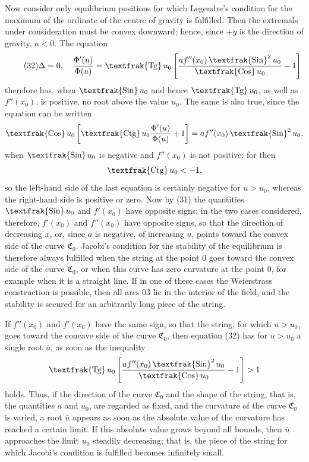 \documentclass[11pt,a4paper,leqno]{article}
\newcommand{\Cof}{\mathop{\text{\textfrak{Cos}}}\nolimits}
\newcommand{\Sin}{\mathop{\text{\textfrak{Sin}}}\nolimits}
\newcommand{\Tg}{\mathop{\text{\textfrak{Tg}}}\nolimits}
\newcommand{\Ctg}{\mathop{\text{\textfrak{Ctg}}}\nolimits}
\begin{document}
Now consider only equilibrium positions for which Legendre's condition for the maximum of the ordinate of the centre of gravity is fulfilled. Then the extremals under consideration must be convex downward; hence, since $+y$ is the direction of gravity, $a<0$. The equation
\begin{equation}\tag{32}
\Delta=0,
\quad
\frac{\Phi'(u)}{\Phi(u)}=\Tg u_0\left[\frac{a f''(x_0)\Sin^2u_0}{\Cof u_0}-1\right]
\end{equation}
therefore has, when $\Sin u_0$ and hence $\Tg u_0$, as well as $f''(x_0)$, is positive, no root above the value $u_0$. The same is also true, since the equation can be written
\[
\Cof u_0\left[\Ctg u_0\frac{\Phi'(u)}{\Phi(u)}+1\right]=a f''(x_0)\Sin^2u_0,
\]
when $\Sin u_0$ is negative and $f''(x_0)$ is not positive; for then
\[
\Ctg u_0<-1,
\]
so the left-hand side of the last equation is certainly negative for $u>u_0$, whereas the right-hand side is positive or zero. Now by (31) the quantities $\Sin u_0$ and $f'(x_0)$ have opposite signs; in the two cases considered, therefore, $f'(x_0)$ and $f''(x_0)$ have opposite signs, so that the direction of decreasing $x$, or, since $a$ is negative, of increasing $u$, points toward the convex side of the curve $\mathfrak{C}_0$. Jacobi's condition for the stability of the equilibrium is therefore always fulfilled when the string at the point 0 goes toward the convex side of the curve $\mathfrak{C}_0$, or when this curve has zero curvature at the point 0, for example when it is a straight line. If in one of these cases the Weierstrass
construction is possible, then all arcs 03 lie in the interior of the field, and the stability is secured for an arbitrarily long piece of the string.

If $f''(x_0)$ and $f'(x_0)$ have the same sign, so that the string, for which $u>u_0$, goes toward the concave side of the curve $\mathfrak{C}_0$, then equation (32) has for $u>u_0$ a single root $\bar u$, as soon as the inequality
\[
\Tg u_0\left[\frac{a f''(x_0)\Sin^2u_0}{\Cof u_0}-1\right]>1
\]
holds. Thus, if the direction of the curve $\mathfrak{C}_0$ and the shape of the string, that is, the quantities $a$ and $u_0$, are regarded as fixed, and the curvature of the curve $\mathfrak{C}_0$ is varied, a root $\bar u$ appears as soon as the absolute value of the curvature has reached a certain limit. If this absolute value grows beyond all bounds, then $\bar u$ approaches the limit $u_0$ steadily decreasing; that is, the piece of the string for which Jacobi's condition is fulfilled becomes infinitely small.
\end{document}

